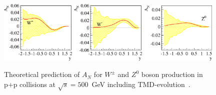 \documentclass[12pt]{article}
\begin{document}
\begin{figure}[htbp]
  \centering
  \includegraphics[width=0.32\textwidth]{images/predictions/w_plus.eps}
  \includegraphics[width=0.32\textwidth]{images/predictions/w_minus.eps}
  \includegraphics[width=0.32\textwidth]{images/predictions/z0.eps}
  \caption{Theoretical prediction of $A_{N}$ for $W^{\pm}$ and $Z^{0}$ boson production in p+p collisions at $\sqrt{s}=500$~GeV including TMD-evolution~\cite{Kang:2014}.}
  \label{Fig:An-prediction}
\end{figure}
\end{document}
